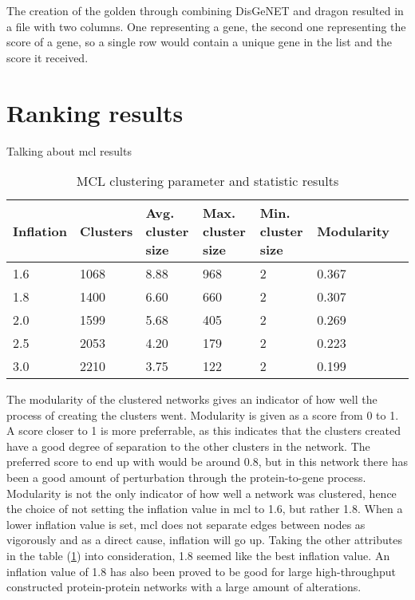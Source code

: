 The creation of the \gls{golden} through combining DisGeNET and \gls{dragon}
resulted in a file with two columns. One representing a gene, the second one
representing the score of a gene, so a single row would contain a unique gene in
the list and the score it received.

\section{Ranking results}
Talking about \gls{mcl} results
\begin{table}[H]
    \centering
    \begin{tabular}{| l | p{2cm} | p{2cm} | p{2cm} | p{2cm} | p{2cm} | p{2cm} |}
        \hline
        \textbf{Inflation} & \textbf{Clusters} & \textbf{Avg.  cluster size} &
        \textbf{Max. cluster size} & \textbf{Min. cluster size} &
        \textbf{Modularity} \\
        \hline
        1.6 & 1068 & 8.88 & 968 & 2 & 0.367 \\
        1.8 & 1400 & 6.60 & 660 & 2 & 0.307 \\
        2.0 & 1599 & 5.68 & 405 & 2 & 0.269 \\
        2.5 & 2053 & 4.20 & 179 & 2 & 0.223 \\
        3.0 & 2210 & 3.75 & 122 & 2 & 0.199 \\
        \hline
    \end{tabular}
    \caption{MCL clustering parameter and statistic results}
    \label{tab:mcl-inflation}
\end{table}
The modularity of the clustered networks gives an indicator of how well the
process of creating the clusters went. Modularity is given as a score from 0 to
1. A score closer to 1 is more preferrable, as this indicates that the clusters
created have a good degree of separation to the other clusters in the network.
The preferred score to end up with would be around 0.8, but in this network
there has been a good amount of perturbation through the protein-to-gene
process. Modularity is not the only indicator of how well a network was
clustered, hence the choice of not setting the inflation value in \gls{mcl} to
1.6, but rather 1.8. When a lower inflation value is set, \gls{mcl} does not
separate edges between nodes as vigorously and as a direct cause, inflation will
go up. Taking the other attributes in the table (\ref{tab:mcl-inflation}) into
consideration, 1.8 seemed like the best inflation value. An inflation value of
1.8 has also been proved to be good for large high-throughput constructed
protein-protein networks with a large amount of alterations\cite{mcl-inflation}.

